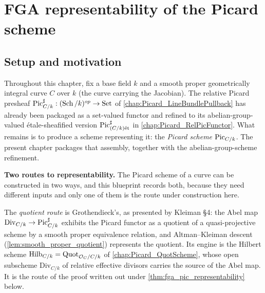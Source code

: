 \chapter{FGA representability of the Picard scheme}
\label{chap:Picard_FGAPicRepresentability}

\section{Setup and motivation}
\label{sec:fga_pic_setup}

Throughout this chapter, fix a base field \(k\) and a smooth proper geometrically
integral curve \(C\) over \(k\) (the curve carrying the Jacobian). The relative
Picard presheaf \(\operatorname{Pic}^\sharp_{C/k} : (\operatorname{Sch}/k)^{op} \to \mathrm{Set}\) of
\cref{chap:Picard_LineBundlePullback} has already been packaged as a
set-valued functor and refined to its abelian-group-valued
\'etale-sheafified version \(\operatorname{Pic}^\sharp_{(C/k)\mathrm{\acute{e}t}}\) in
\cref{chap:Picard_RelPicFunctor}. What remains is to produce a scheme
representing it: the \emph{Picard scheme} \(\operatorname{Pic}_{C/k}\). The present chapter
packages that assembly, together with the abelian-group-scheme refinement.

\medskip

\textbf{Two routes to representability.} The Picard scheme of a curve can be
constructed in two ways, and this blueprint records both, because they need
different inputs and only one of them is the route under construction here.

The \emph{quotient route} is Grothendieck's, as presented by Kleiman \S 4: the
Abel map \(\mathrm{Div}_{C/k} \to \operatorname{Pic}^\sharp_{C/k}\) exhibits the Picard functor
as a quotient of a quasi-projective scheme by a smooth proper equivalence
relation, and Altman--Kleiman descent
(\cref{lem:smooth_proper_quotient}) represents the quotient. Its engine is the
Hilbert scheme \(\operatorname{Hilb}_{C/k} = \operatorname{Quot}_{\mathcal{O}_C/C/k}\) of
\cref{chap:Picard_QuotScheme}, whose open subscheme \(\mathrm{Div}_{C/k}\) of
relative effective divisors carries the source of the Abel map. It is the route of
the proof written out under \cref{thm:fga_pic_representability} below.

